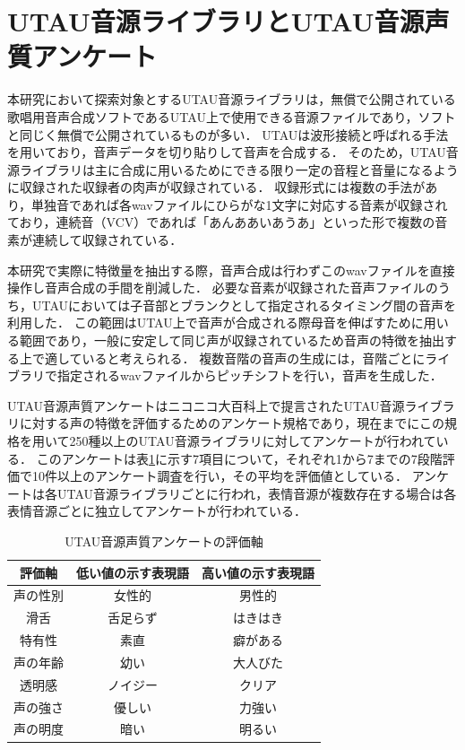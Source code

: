 \section{UTAU音源ライブラリとUTAU音源声質アンケート}
本研究において探索対象とするUTAU音源ライブラリは，無償で公開されている歌唱用音声合成ソフトであるUTAU上で使用できる音源ファイルであり，ソフトと同じく無償で公開されているものが多い．
UTAUは波形接続と呼ばれる手法を用いており，音声データを切り貼りして音声を合成する．
そのため，UTAU音源ライブラリは主に合成に用いるためにできる限り一定の音程と音量になるように収録された収録者の肉声が収録されている．
収録形式には複数の手法があり，単独音であれば各wavファイルにひらがな1文字に対応する音素が収録されており，連続音（VCV）であれば「あんああいあうあ」\cite{tatsu3shiki}といった形で複数の音素が連続して収録されている．

本研究で実際に特徴量を抽出する際，音声合成は行わずこのwavファイルを直接操作し音声合成の手間を削減した．
必要な音素が収録された音声ファイルのうち，UTAUにおいては子音部とブランクとして指定されるタイミング間の音声を利用した．
この範囲はUTAU上で音声が合成される際母音を伸ばすために用いる範囲であり，一般に安定して同じ声が収録されているため音声の特徴を抽出する上で適していると考えられる．
複数音階の音声の生成には，音階ごとにライブラリで指定されるwavファイルからピッチシフトを行い，音声を生成した．

UTAU音源声質アンケートはニコニコ大百科上で提言されたUTAU音源ライブラリに対する声の特徴を評価するためのアンケート規格であり，現在までにこの規格を用いて250種以上のUTAU音源ライブラリに対してアンケートが行われている．
このアンケートは表\ref{tab:survey}に示す7項目について，それぞれ1から7までの7段階評価で10件以上のアンケート調査を行い，その平均を評価値としている．
アンケートは各UTAU音源ライブラリごとに行われ，表情音源が複数存在する場合は各表情音源ごとに独立してアンケートが行われている．

\begin{table}[htb]
  \centering
  \caption{UTAU音源声質アンケートの評価軸}
  \label{tab:survey}
  \begin{tabular}{c|cc}
    \hline
    評価軸 & 低い値の示す表現語 & 高い値の示す表現語 \\
    \hline
    声の性別 & 女性的 & 男性的 \\
    滑舌 & 舌足らず & はきはき \\
    特有性 & 素直 & 癖がある \\
    声の年齢 & 幼い & 大人びた \\
    透明感 & ノイジー & クリア \\
    声の強さ & 優しい & 力強い \\
    声の明度 & 暗い & 明るい \\
    \hline
  \end{tabular}
\end{table}

